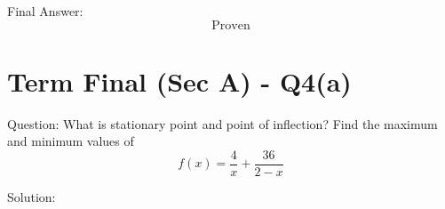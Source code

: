 \documentclass[11pt, a4paper]{article}
\begin{document}
Final Answer:
\[ 
\boxed{\text{Proven}} 
\]



\section*{Term Final (Sec A) - Q4(a)}

Question:
What is stationary point and point of inflection? Find the maximum and minimum values of 
\[ f(x) = \frac{4}{x} + \frac{36}{2-x} \]

Solution:
\end{document}
